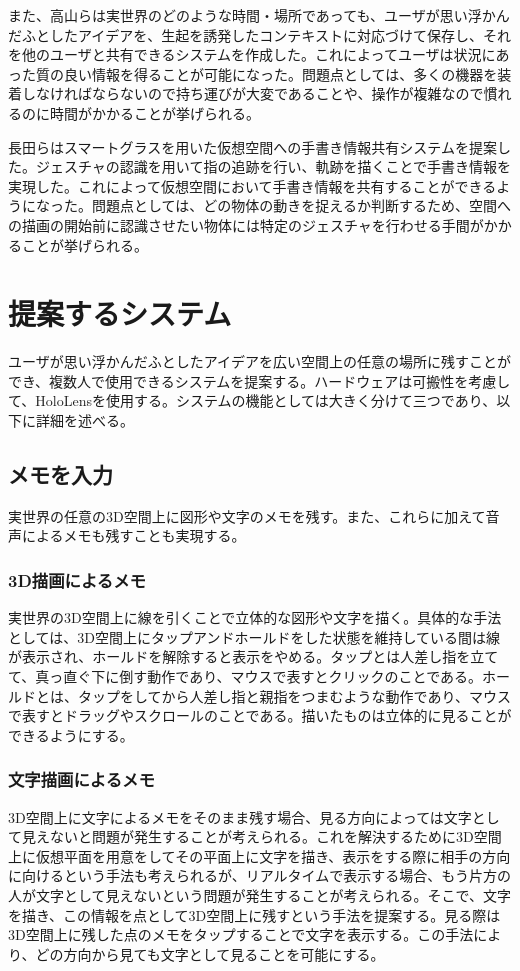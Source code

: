 \documentclass{hissymp}
\begin{document}
また、高山ら\cite{tex3,tex4}は実世界のどのような時間・場所であっても、ユーザが思い浮かんだふとしたアイデアを、生起を誘発したコンテキストに対応づけて保存し、それを他のユーザと共有できるシステムを作成した。これによってユーザは状況にあった質の良い情報を得ることが可能になった。問題点としては、多くの機器を装着しなければならないので持ち運びが大変であることや、操作が複雑なので慣れるのに時間がかかることが挙げられる。

長田ら\cite{tex5}はスマートグラスを用いた仮想空間への手書き情報共有システムを提案した。ジェスチャの認識を用いて指の追跡を行い、軌跡を描くことで手書き情報を実現した。これによって仮想空間において手書き情報を共有することができるようになった。問題点としては、どの物体の動きを捉えるか判断するため、空間への描画の開始前に認識させたい物体には特定のジェスチャを行わせる手間がかかることが挙げられる。


\section{提案するシステム}
ユーザが思い浮かんだふとしたアイデアを広い空間上の任意の場所に残すことができ、複数人で使用できるシステムを提案する。ハードウェアは可搬性を考慮して、HoloLensを使用する。システムの機能としては大きく分けて三つであり、以下に詳細を述べる。

\subsection{メモを入力}
実世界の任意の3D空間上に図形や文字のメモを残す。また、これらに加えて音声によるメモも残すことも実現する。
\subsubsection{3D描画によるメモ}
実世界の3D空間上に線を引くことで立体的な図形や文字を描く。具体的な手法としては、3D空間上にタップアンドホールドをした状態を維持している間は線が表示され、ホールドを解除すると表示をやめる。タップとは人差し指を立てて、真っ直ぐ下に倒す動作であり、マウスで表すとクリックのことである。ホールドとは、タップをしてから人差し指と親指をつまむような動作であり、マウスで表すとドラッグやスクロールのことである。描いたものは立体的に見ることができるようにする。
\subsubsection{文字描画によるメモ}
3D空間上に文字によるメモをそのまま残す場合、見る方向によっては文字として見えないと問題が発生することが考えられる。これを解決するために3D空間上に仮想平面を用意をしてその平面上に文字を描き、表示をする際に相手の方向に向けるという手法も考えられるが、リアルタイムで表示する場合、もう片方の人が文字として見えないという問題が発生することが考えられる。そこで、文字を描き、この情報を点として3D空間上に残すという手法を提案する。見る際は3D空間上に残した点のメモをタップすることで文字を表示する。この手法により、どの方向から見ても文字として見ることを可能にする。
\end{document}
